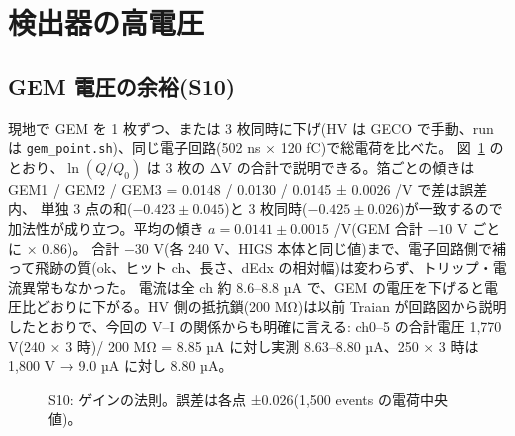 \documentclass[a4paper,11pt]{ltjsarticle}
\begin{document}
\section{検出器の高電圧}

\subsection{GEM 電圧の余裕(S10)}
現地で GEM を 1 枚ずつ、または 3 枚同時に下げ(HV は GECO で手動、run は \texttt{gem\_point.sh})、同じ電子回路(502 ns × 120 fC)で総電荷を比べた。
図~\ref{fig:gain} のとおり、$\ln(Q/Q_0)$ は 3 枚の ΔV の合計で説明できる。箔ごとの傾きは GEM1 / GEM2 / GEM3 = 0.0148 / 0.0130 / 0.0145 ± 0.0026 /V で差は誤差内、
単独 3 点の和($-0.423 \pm 0.045$)と 3 枚同時($-0.425 \pm 0.026$)が一致するので加法性が成り立つ。平均の傾き $a = 0.0141 \pm 0.0015$ /V(GEM 合計 $-10$ V ごとに × 0.86)。
合計 $-30$ V(各 240 V、HIGS 本体と同じ値)まで、電子回路側で補って飛跡の質(ok、ヒット ch、長さ、dEdx の相対幅)は変わらず、トリップ・電流異常もなかった。
電流は全 ch 約 8.6--8.8 µA で、GEM の電圧を下げると電圧比どおりに下がる。HV 側の抵抗鎖(200 MΩ)は以前 Traian が回路図から説明したとおりで、今回の V--I の関係からも明確に言える: ch0--5 の合計電圧 1,770 V(240 × 3 時)/ 200 MΩ = 8.85 µA に対し実測 8.63--8.80 µA、250 × 3 時は 1,800 V → 9.0 µA に対し 8.80 µA。

\begin{figure}[H]\centering
{}
\caption{S10: ゲインの法則。誤差は各点 ±0.026(1,500 events の電荷中央値)。}
\label{fig:gain}
\end{figure}
\end{document}
